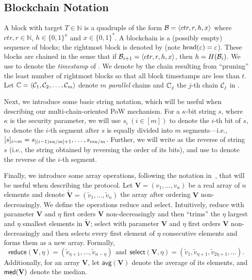 \subsection{Blockchain Notation}

A block with target $T \in \mathbb{N}$ is a quadruple of the form $\mathcal{B} = \langle ctr, r, h, x \rangle$ where $ctr, r \in \mathbb{N}$, $h \in \{0, 1\}^{\kappa}$ and $x \in \{0, 1\}^*$.
%
A blockchain \chain is a (possibly empty) sequence of blocks; the rightmost block is denoted by \chainHead{\chain} (note $\mathrm{head}(\varepsilon) = \varepsilon$).
%
These blocks are chained in the sense that if $\mathcal{B}_{i + 1} = \langle ctr, r, h, x \rangle$, then $h = H(\mathcal{B}_i)$.
%
We use \timestamp{\block} to denote the \emph{timestamp} of \block.
%
We denote by  the chain resulting from ``pruning'' the least number of rightmost blocks so that all block timestamps are less than $t$.
%
Let $\mathbb{C} = \langle \mathcal{C}_1, \mathcal{C}_2, \ldots, \mathcal{C}_m \rangle$ denote $m$ \emph{parallel} chains and $\mathbb{C}_j$ the $j$-th chain $\mathcal{C}_j$ in \parallelChains.

Next, we introduce some basic string notation, which will be useful when describing our multi-chain-oriented PoW mechanism.
%
For a $\kappa$-bit string $s$, where $\kappa$ is the security parameter, we will use $s_i~(i \in [m])$ to denote the $i$-th bit of $s$,  to denote the $i$-th segment after $s$ is equally divided into $m$ segments---i.e., $[s]_{i\sim m} = s_{[(i - 1) * \kappa / m ]+ 1}, \ldots, s_{i * \kappa / m}$.
%
Further, we will write  as the reverse of string $s$ (i.e., the string obtained by reversing the order of its bits), and use  to denote the reverse of the $i$-th segment.

Finally, we introduce some array operations, following the notation in~\cite{JACM:DLPSW86}, that will be useful when describing the protocol.
%
Let $\mathbf{V} = (v_1, \ldots, v_n)$ be a real array of $n$ elements and denote $\tilde{\mathbf{V}} = (\tilde{v}_1, \ldots, \tilde{v}_n)$ the array after ordering $\mathbf{V}$ non-decreasingly.
%
We define the operations \textsf{reduce} and \textsf{select}.
%
Intuitively, \textsf{reduce} with parameter $\mathbf{V}$ and $\eta$ first orders $\mathbf{V}$ non-decreasingly and then ``trims'' the $\eta$ largest and $\eta$ smallest elements in $\tilde{\mathbf{V}}$; \textsf{select} with parameter $\mathbf{V}$ and $\eta$ first orders $\mathbf{V}$ non-decreasingly and then selects every first element of $\eta$ consecutive elements and forms them as a new array.
%
Formally,
%
\begin{equation} \label{eq:reduce-select}
    \mathsf{reduce}(\mathbf{V}, \eta) = (\tilde{v}_{\eta + 1}, \ldots, \tilde{v}_{n - \eta})
    ~~\text{and}~~
    \mathsf{select}(\mathbf{V}, \eta) = (\tilde{v}_1, \tilde{v}_{\eta + 1}, \tilde{v}_{2\eta + 1}, \ldots).
\end{equation}
%
Additionally, for an array $\mathbf{V}$, let $\mathsf{avg}(\mathbf{V})$ denote the average of its elements, and $\mathsf{med}(\mathbf{V})$ denote the median.
